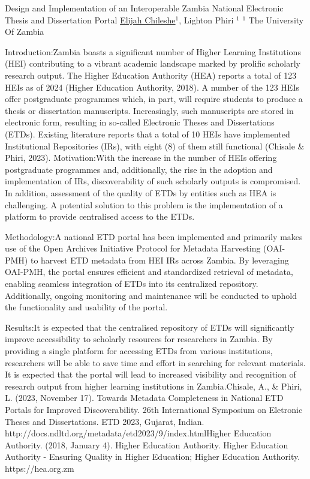 
    \begin{abstract_online}{Design and Implementation of an Interoperable Zambia National Electronic Thesis and Dissertation Portal{%
        \underline{Elijah Chileshe}}$^{1}$, Lighton Phiri $^{1}$}{%
        }{%
        $^1$ The University Of Zambia}
   
   Introduction:Zambia boasts a significant number of Higher Learning Institutions (HEI) contributing to a vibrant academic landscape marked by prolific scholarly research output. The Higher Education Authority (HEA) reports a total of 123 HEIs as of 2024 (Higher Education Authority, 2018). A number of the 123 HEIs offer postgraduate programmes which, in part, will require students to produce a thesis or dissertation manuscripts. Increasingly, such manuscripts are stored in electronic form, resulting in so-called Electronic Theses and Dissertations (ETDs). Existing literature reports that a total of 10 HEIs have implemented Institutional Repositories (IRs), with eight (8) of them still functional (Chisale & Phiri, 2023). Motivation:With the increase in the number of HEIs offering postgraduate programmes and, additionally, the rise in the adoption and implementation of IRs, discoverability of such scholarly outputs is compromised. In addition, assessment of the quality of ETDs by entities such as HEA is challenging. A potential solution to this problem is the implementation of a platform to provide centralised access to the ETDs. 
    
    Methodology:A national ETD portal has been implemented and primarily makes use of the Open Archives Initiative Protocol for Metadata Harvesting (OAI-PMH) to harvest ETD metadata from HEI IRs across Zambia. By leveraging OAI-PMH, the portal ensures efficient and standardized retrieval of metadata, enabling seamless integration of ETDs into its centralized repository. Additionally, ongoing monitoring and maintenance will be conducted to uphold the functionality and usability of the portal.
    
    Results:It is expected that the centralised repository of ETDs will significantly improve accessibility to scholarly resources for researchers in Zambia. By providing a single platform for accessing ETDs from various institutions, researchers will be able to save time and effort in searching for relevant materials. It is expected that the portal will lead to increased visibility and recognition of research output from higher learning institutions in Zambia.Chisale, A., & Phiri, L. (2023, November 17). Towards Metadata Completeness in National ETD Portals for Improved Discoverability. 26th International Symposium on Eletronic Theses and Dissertations. ETD 2023, Gujarat, Indian. http://docs.ndltd.org/metadata/etd2023/9/index.htmlHigher Education Authority. (2018, January 4). Higher Education Authority. Higher Education Authority - Ensuring Quality in Higher Education; Higher Education Authority. https://hea.org.zm
    \end{abstract_online}
    
